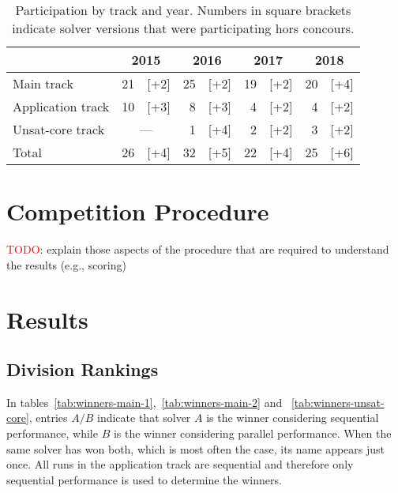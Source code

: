 \documentclass[twoside,11pt]{article}
\newcommand{\TODO}[0]{\textcolor{red}{TODO}}
\begin{document}
\begin{table}
  \caption{Participation by track and year.  Numbers in square
    brackets indicate solver versions that were participating hors
    concours.}
  \label{table:participation-by-track}
  \centering
  \begin{tabular}{|l|r@{\,\,}r|r@{\,\,}r|r@{\,\,}r|r@{\,\,}r|}
    \hline
                      & \multicolumn{2}{c|}{2015} & \multicolumn{2}{c|}{2016} & \multicolumn{2}{c|}{2017} & \multicolumn{2}{c|}{2018} \\
    \hline
    Main track        & 21 &                [+2] & 25 & [+2] & 19 & [+2] & 20 & [+4] \\
    Application track & 10 &                [+3] &  8 & [+3] &  4 & [+2] &  4 & [+2] \\
    Unsat-core track  & \multicolumn{2}{c|}{---} &  1 & [+4] &  2 & [+2] &  3 & [+2] \\
    \hline
    Total             & 26 &                [+4] & 32 & [+5] & 22 & [+4] & 25 & [+6] \\
    \hline
  \end{tabular}
\end{table}


\section{Competition Procedure}
\label{sec:procedure}

\TODO: explain those aspects of the procedure that are required to
understand the results (e.g., scoring)


\section{Results}
\label{sec:results}

\subsection{Division Rankings}
\label{sec:division-rankings}

In tables~\ref{tab:winners-main-1},~\ref{tab:winners-main-2} and
~\ref{tab:winners-unsat-core}, entries $A/B$ indicate that solver $A$
is the winner considering sequential performance, while $B$ is the
winner considering parallel performance. When the same solver has won
both, which is most often the case, its name appears just once. All
runs in the application track are sequential and therefore only
sequential performance is used to determine the winners.
\end{document}
